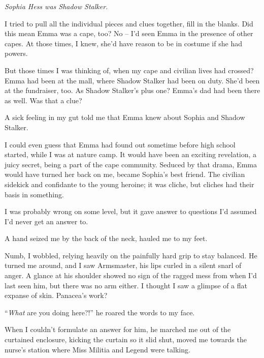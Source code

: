 \emph{Sophia Hess was Shadow Stalker.}



I tried to pull all the individual pieces and clues together, fill in the blanks.  Did this mean Emma was a cape, too?  No – I'd seen Emma in the presence of other capes.  At those times, I knew, she'd have reason to be in costume if she had powers.



But those times I was thinking of, when my cape and civilian lives had crossed?  Emma had been at the mall, where Shadow Stalker had been on duty.  She'd been at the fundraiser, too.  As Shadow Stalker's plus one?  Emma's dad had been there as well.  Was that a clue?



A sick feeling in my gut told me that Emma knew about Sophia and Shadow Stalker.



I could even guess that Emma had found out sometime before high school started, while I was at nature camp.  It would have been an exciting revelation, a juicy secret, being a part of the cape community.  Seduced by that drama, Emma would have turned her back on me, became Sophia's best friend.  The civilian sidekick and confidante to the young heroine; it was cliche, but cliches had their basis in something.



I was probably wrong on some level, but it gave answer to questions I'd assumed I'd never get an answer to.



A  hand seized me by the back of the neck, hauled me to my feet.



Numb, I wobbled, relying heavily on the painfully hard grip to stay balanced.  He turned me around, and I saw Armsmaster, his lips curled in a silent snarl of anger.   A glance at his shoulder showed no sign of the ragged mess from when I'd last seen him, but there was no arm either.  I thought I saw a glimpse of a flat expanse of skin.  Panacea's work?



``\emph{What} are you doing here?!'' he roared the words to my face.



When I couldn't formulate an answer for him, he marched me out of the curtained enclosure, kicking the curtain so it slid shut, moved me towards the nurse's station where Miss Militia and Legend were talking.



